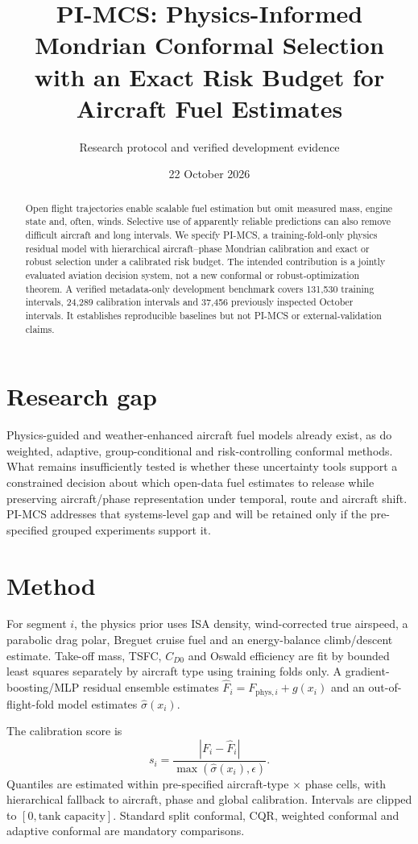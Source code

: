 \documentclass[11pt]{article}
\title{PI-MCS: Physics-Informed Mondrian Conformal Selection\\with an Exact Risk Budget for Aircraft Fuel Estimates}
\author{Research protocol and verified development evidence}
\date{22 October 2026}
\begin{document}
\maketitle

\begin{abstract}
Open flight trajectories enable scalable fuel estimation but omit measured mass,
engine state and, often, winds. Selective use of apparently reliable predictions
can also remove difficult aircraft and long intervals. We specify PI-MCS, a
training-fold-only physics residual model with hierarchical aircraft--phase
Mondrian calibration and exact or robust selection under a calibrated risk
budget. The intended contribution is a jointly evaluated aviation decision
system, not a new conformal or robust-optimization theorem. A verified
metadata-only development benchmark covers 131,530 training intervals, 24,289
calibration intervals and 37,456 previously inspected October intervals. It
establishes reproducible baselines but not PI-MCS or external-validation claims.
\end{abstract}

\section{Research gap}
Physics-guided and weather-enhanced aircraft fuel models already exist, as do
weighted, adaptive, group-conditional and risk-controlling conformal methods.
What remains insufficiently tested is whether these uncertainty tools support a
constrained decision about which open-data fuel estimates to release while
preserving aircraft/phase representation under temporal, route and aircraft
shift. PI-MCS addresses that systems-level gap and will be retained only if the
pre-specified grouped experiments support it.

\section{Method}
For segment $i$, the physics prior uses ISA density, wind-corrected true
airspeed, a parabolic drag polar, Breguet cruise fuel and an energy-balance
climb/descent estimate. Take-off mass, TSFC, $C_{D0}$ and Oswald efficiency are
fit by bounded least squares separately by aircraft type using training folds
only. A gradient-boosting/MLP residual ensemble estimates
$\widehat F_i=F_{\mathrm{phys},i}+g(x_i)$ and an out-of-flight-fold model estimates
$\widehat\sigma(x_i)$.

The calibration score is
\[
 s_i=\frac{|F_i-\widehat F_i|}{\max(\widehat\sigma(x_i),\epsilon)}.
\]
Quantiles are estimated within pre-specified aircraft-type $\times$ phase cells,
with hierarchical fallback to aircraft, phase and global calibration. Intervals
are clipped to $[0,\text{tank capacity}]$. Standard split conformal, CQR,
weighted conformal and adaptive conformal are mandatory comparisons.
\end{document}
